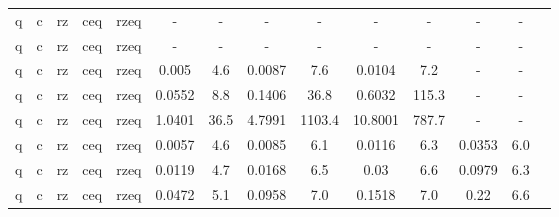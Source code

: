 \begin{table}[htb]
{\begin{tabular}{|c|c|c|c|c|c|c|c|c|c|c|c|c|c|}
q & c & rz & ceq & rzeq & - & - & - & - & - & - & - & - \\ 
q & c & rz & ceq & rzeq & - & - & - & - & - & - & - & - \\ 
q & c & rz & ceq & rzeq & 0.005 & 4.6 & 0.0087 & 7.6 & 0.0104 & 7.2 & - & - \\ 
q & c & rz & ceq & rzeq & 0.0552 & 8.8 & 0.1406 & 36.8 & 0.6032 & 115.3 & - & - \\ 
q & c & rz & ceq & rzeq & 1.0401 & 36.5 & 4.7991 & 1103.4 & 10.8001 & 787.7 & - & - \\ 
q & c & rz & ceq & rzeq & 0.0057 & 4.6 & 0.0085 & 6.1 & 0.0116 & 6.3 & 0.0353 & 6.0 \\ 
q & c & rz & ceq & rzeq & 0.0119 & 4.7 & 0.0168 & 6.5 & 0.03 & 6.6 & 0.0979 & 6.3 \\ 
q & c & rz & ceq & rzeq & 0.0472 & 5.1 & 0.0958 & 7.0 & 0.1518 & 7.0 & 0.22 & 6.6 \\ 
\hline 
\end{tabular}} 
\end{table} 
